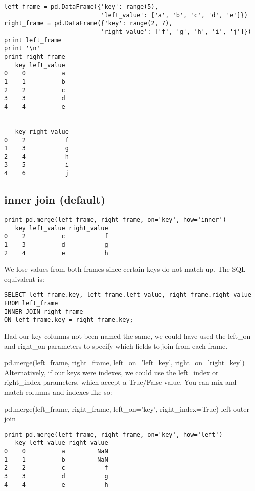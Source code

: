 \begin{framed}
\begin{framed}
\begin{framed}
\begin{framed}
\begin{framed}
\begin{framed}
\begin{framed}
\begin{framed}
\begin{framed}
\begin{framed}
\begin{framed}
\begin{framed}
\begin{framed}
\begin{verbatim}
left_frame = pd.DataFrame({'key': range(5), 
                           'left_value': ['a', 'b', 'c', 'd', 'e']})
right_frame = pd.DataFrame({'key': range(2, 7), 
                           'right_value': ['f', 'g', 'h', 'i', 'j']})
print left_frame
print '\n'
print right_frame
   key left_value
0    0          a
1    1          b
2    2          c
3    3          d
4    4          e


   key right_value
0    2           f
1    3           g
2    4           h
3    5           i
4    6           j
\end{verbatim}


\subsection{inner join (default)}

\begin{framed}
\begin{verbatim}
print pd.merge(left_frame, right_frame, on='key', how='inner')
   key left_value right_value
0    2          c           f
1    3          d           g
2    4          e           h
\end{verbatim}


We lose values from both frames since certain keys do not match up. The SQL equivalent is:

\begin{verbatim}
SELECT left_frame.key, left_frame.left_value, right_frame.right_value
FROM left_frame
INNER JOIN right_frame
ON left_frame.key = right_frame.key;
\end{verbatim}

Had our key columns not been named the same, we could have used the left_on and right_on parameters to specify which fields to join from each frame.

    pd.merge(left_frame, right_frame, left_on='left_key', right_on='right_key')
Alternatively, if our keys were indexes, we could use the left_index or right_index parameters, which accept a True/False value. You can mix and match columns and indexes like so:

    pd.merge(left_frame, right_frame, left_on='key', right_index=True)
left outer join


\begin{framed}
\begin{verbatim}
print pd.merge(left_frame, right_frame, on='key', how='left')
   key left_value right_value
0    0          a         NaN
1    1          b         NaN
2    2          c           f
3    3          d           g
4    4          e           h
\end{verbatim}



\end{framed}
\end{framed}
\end{framed}
\end{framed}
\end{framed}
\end{framed}
\end{framed}
\end{framed}
\end{framed}
\end{framed}
\end{framed}
\end{framed}
\end{framed}
\end{framed}
\end{framed}
